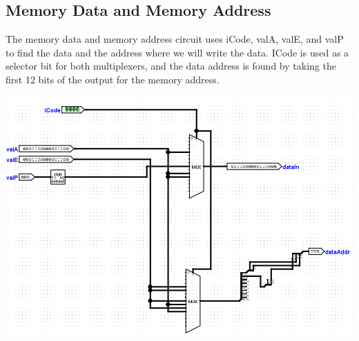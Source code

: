\documentclass{article}
\begin{document}
\subsection{Memory Data and Memory Address}
The memory data and memory address circuit uses iCode, valA, valE, and valP to find the data and the address where we will write the data. ICode is used as a selector bit for both multiplexers, and the data address is found by taking the first 12 bits of the output for the memory address.
\begin{center}
    \includegraphics[scale=.6]{memaddrdata.png}
\end{center}
\end{document}
